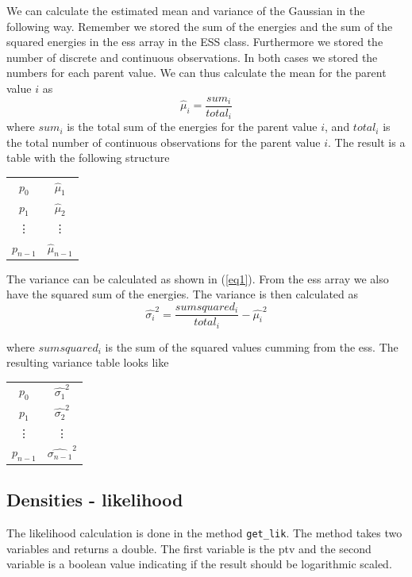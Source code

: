 \documentclass[10pt, journal, compsocconf,a4paper]{IEEEtran}
\begin{document}
We can calculate the estimated mean and variance of the Gaussian in the following way. Remember we stored the sum of the energies and the sum of the squared energies in the ess array in the ESS class. Furthermore we stored the number of discrete and continuous observations. In both cases we stored the numbers for each parent value. We can thus calculate the mean for the parent value $i$ as
\begin{equation}
  \hat{\mu}_i = \frac{sum_i}{total_i} 
\end{equation}
where $sum_i$ is the total sum of the energies for the parent value $i$, and $total_i$ is the total number of continuous observations for the parent value $i$. The result is a table with the following structure
\begin{center}
  \begin{tabular}{c | c }
  $p_0$ & $\hat{\mu}_1$ \\
  $p_1$ & $\hat{\mu}_2$ \\
  \vdots & \vdots \\
  $p_{n-1}$ & $\hat{\mu}_{n-1}$  
  \end{tabular}  
\end{center}


The variance can be calculated as shown in (\ref{eq1}). From the ess array we also have the squared sum of the energies. The variance is then calculated as
\begin{equation}
  \hat{\sigma_i}^2 = \frac{sumsquared_i}{total_i} - \hat{\mu_i}^2
\end{equation}

where $sumsquared_i$ is the sum of the squared values cumming from the ess. The resulting variance table looks like
\begin{center}
  \begin{tabular}{c | c }
  $p_0$ & $\hat{\sigma_1}^2$ \\
  $p_1$ & $\hat{\sigma_2}^2$ \\
  \vdots & \vdots \\
  $p_{n-1}$ & $\hat{\sigma_{n-1}}^2$  
  \end{tabular}  
\end{center}


\subsection{Densities - likelihood} %
\label{sub:densities_likelihood}
The likelihood calculation is done in the method \texttt{get\_lik}. The method takes two variables and returns a double. The first variable is the ptv and the second variable is a boolean value indicating if the result should be logarithmic scaled.
\end{document}
